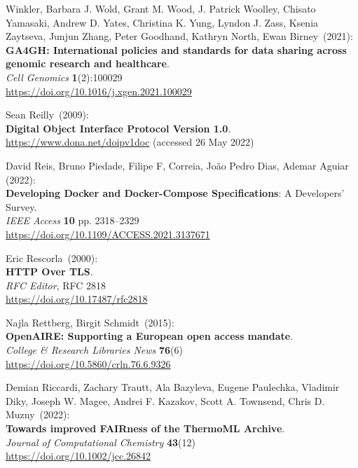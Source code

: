 \begin{thebibliography}{9}
Winkler, Barbara J. Wold, Grant M. Wood, J. Patrick Woolley, Chisato Yamasaki, Andrew D. Yates, Christina K. Yung, Lyndon J. Zass, Ksenia Zaytseva, Junjun Zhang, Peter Goodhand, Kathryn North, Ewan Birney~(2021): \\
\textbf{GA4GH: International policies and standards for data sharing across genomic research and healthcare}.\\
\emph{Cell Genomics} \textbf{1}(2):100029\\
\url{https://doi.org/10.1016/j.xgen.2021.100029}

Sean Reilly~(2009): \\
\textbf{Digital Object Interface Protocol Version 1.0}.\\
\url{https://www.dona.net/doipv1doc} (accessed 26 May 2022)

David Reis, Bruno Piedade, Filipe F, Correia, João Pedro Dias, Ademar Aguiar (2022): \\
\textbf{Developing Docker and Docker-Compose Specifications}: A Developers’ Survey.\\
\emph{IEEE Access} \textbf{10} pp. 2318--2329 \\
\url{https://doi.org/10.1109/ACCESS.2021.3137671}

Eric Rescorla~(2000): \\
\textbf{HTTP Over TLS}.\\
\emph{RFC Editor}, RFC 2818\\
\url{https://doi.org/10.17487/rfc2818}

Najla Rettberg, Birgit Schmidt~(2015): \\
\textbf{OpenAIRE: Supporting a European open access mandate}.\\
\emph{College \& Research Libraries News} \textbf{76}(6) \\
\url{https://doi.org/10.5860/crln.76.6.9326}

Demian Riccardi, Zachary Trautt, Ala Bazyleva, Eugene Paulechka, Vladimir Diky, Joseph W. Magee, Andrei F. Kazakov, Scott A. Townsend, Chris D. Muzny~(2022): \\
\textbf{Towards improved {FAIRness} of the {ThermoML} Archive}.\\
\emph{Journal of Computational Chemistry} \textbf{43}(12)\\
\url{https://doi.org/10.1002/jcc.26842}



\end{thebibliography}
